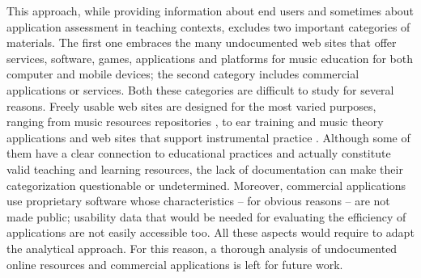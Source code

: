 \documentclass[journal]{IEEEtran}
\begin{document}
This approach, while providing information about end users and sometimes about application assessment in teaching contexts, excludes two important categories of materials. The first one embraces the many undocumented web sites that offer services, software, games, applications and platforms for music education for both computer and mobile devices; the second category includes commercial applications or services. Both these categories are difficult to study for several reasons. Freely usable web sites are designed for the most varied purposes, ranging from music resources repositories \cite{BBC, K12}, to ear training and music theory applications \cite{FET, MT} and web sites that support instrumental practice \cite{gstrings, PTG}. Although some of them have a clear connection to educational practices and actually constitute valid teaching and learning resources, the lack of documentation can make their categorization questionable or undetermined. Moreover, commercial applications use proprietary software whose characteristics -- for obvious reasons -- are not made public; usability data that would be needed for evaluating the efficiency of applications are not easily accessible too. All these aspects would require to adapt the analytical approach. For this reason, a thorough analysis of undocumented online resources and commercial applications is left for future work.
\end{document}
